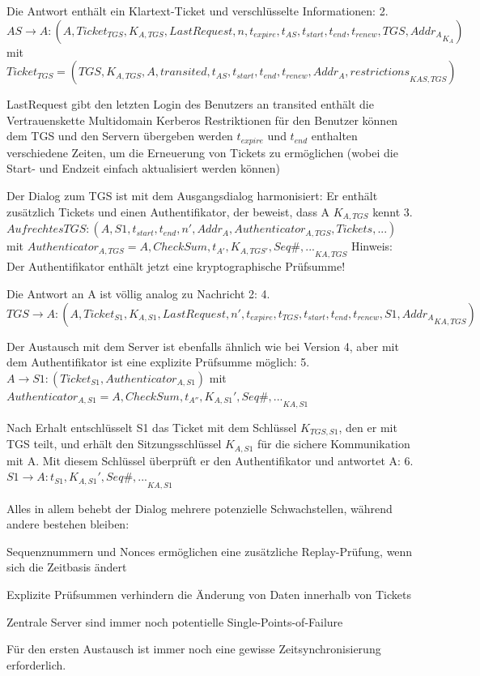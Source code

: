 \documentclass[a4paper]{article}
\begin{document}
\begin{multicols}{3}
\begin{itemize*}
            \item Die Antwort enthält ein Klartext-Ticket und verschlüsselte Informationen: 2. $AS\rightarrow A: (A,Ticket_{TGS},{K_{A,TGS}, LastRequest,n,t_{expire},t_{AS},t_{start},t_{end},t_{renew},TGS, Addr_A}_{K_A})$ mit $Ticket_{TGS}=(TGS, {K_{A,TGS},A,transited, t_{AS}, t_{start},t_{end},t_{renew},Addr_A,restrictions}_{{K}{AS,TGS}})$
            \begin{itemize*}
                  \item LastRequest gibt den letzten Login des Benutzers an transited enthält die Vertrauenskette Multidomain Kerberos Restriktionen für den Benutzer können dem TGS und den Servern übergeben werden $t_{expire}$ und $t_{end}$ enthalten verschiedene Zeiten, um die Erneuerung von Tickets zu ermöglichen (wobei die Start- und Endzeit einfach aktualisiert werden können)
            \end{itemize*}
            \item Der Dialog zum TGS ist mit dem Ausgangsdialog harmonisiert: Er enthält zusätzlich Tickets und einen Authentifikator, der beweist, dass A $K_{A,TGS}$ kennt 3. $Aufrechtes TGS:(A,S1,t_{start},t_{end},n',Addr_A,Authenticator_{A,TGS}, Tickets,...)$ mit $Authenticator_{A,TGS}={A, CheckSum, t_{A'}, K_{A,TGS'}, Seq\#,...}_{{K}{A,TGS}}$ Hinweis: Der Authentifikator enthält jetzt eine kryptographische Prüfsumme!
            \item Die Antwort an A ist völlig analog zu Nachricht 2: 4. $TGS\rightarrow A:(A,Ticket_{S1},{K_{A,S1},LastRequest, n',t_{expire},t_{TGS},t_{start},t_{end},t_{renew},S1,Addr_A}_{{K}{A,TGS}})$
            \item Der Austausch mit dem Server ist ebenfalls ähnlich wie bei Version 4, aber mit dem Authentifikator ist eine explizite Prüfsumme möglich: 5. $A\rightarrow S1:(Ticket_{S1}, Authenticator_{A,S1})$ mit $Authenticator_{A,S1}={A,CheckSum,t_{A''},K_{A,S1}', Seq\#, ...}_{{K}{A,S1}}$
            \item Nach Erhalt entschlüsselt S1 das Ticket mit dem Schlüssel $K_{TGS,S1}$, den er mit TGS teilt, und erhält den Sitzungsschlüssel $K_{A,S1}$ für die sichere Kommunikation mit A. Mit diesem Schlüssel überprüft er den Authentifikator und antwortet A: 6. $S1\rightarrow A:{t_{S1},K_{A,S1}',Seq\#,...}_{{K}{A,S1}}$
            \item Alles in allem behebt der Dialog mehrere potenzielle Schwachstellen, während andere bestehen bleiben:
            \begin{itemize*}
                  \item Sequenznummern und Nonces ermöglichen eine zusätzliche Replay-Prüfung, wenn sich die Zeitbasis ändert
                  \item Explizite Prüfsummen verhindern die Änderung von Daten innerhalb von Tickets
                  \item Zentrale Server sind immer noch potentielle Single-Points-of-Failure
                  \item Für den ersten Austausch ist immer noch eine gewisse Zeitsynchronisierung erforderlich.
            \end{itemize*}
      \end{itemize*}


\end{multicols}
\end{document}
